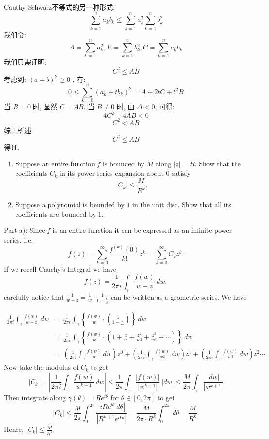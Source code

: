 \documentclass[12pt]{article}
\newenvironment{solution}[2][Solution]{\begin{trivlist}
\item[\hskip \labelsep {\bfseries #1}]}{\end{trivlist}}
\newenvironment{problem}[2][Problem]{\begin{trivlist}
\item[\hskip \labelsep {\bfseries #1}\hskip \labelsep {\bfseries #2.}]}{\end{trivlist}}
\begin{document}
\begin{solution}{2}
Cauthy-Schwarz不等式的另一种形式:
\[
\sum_{k=1}^{n} a_kb_k \leq \sum_{k=1}^n a{_k^2} \sum_{k=1}^{n} b{_k^2}
\]
我们令:
\[
A = \sum_{k=1}^{n} a{_k^2}, 
B = \sum_{k=1}^{n} b{_k^2},
C = \sum_{k=1}^{n} a_kb_k
\]
我们只需证明:
\[
C^2 \leq AB
\]
考虑到: $(a+b)^2 \geq 0$ , 有:
\[
0 \leq \sum_{k=0}^n (a_k+tb_k)^2 = A + 2tC + t^2B
\]
当 $B = 0$ 时, 显然 $C = AB$.
当 $B \neq 0$ 时, 由 $\Delta <0$, 可得:
\[
4C^2 - 4AB < 0
\]
\[
C^2 < AB
\]
综上所述:
\[
C^2 \leq AB
\]
得证.
\end{solution}


\vspace{2cm}



\begin{problem}{2}
\begin{enumerate}[label=\alph*)]
    \item Suppose an entire function $f$ is bounded by $M$ along $|z|=R$. Show that the coefficients $C_k$ in its power series expansion about $0$ satisfy
    \[
    |C_k|\leq\frac{M}{R^k}.
    \]
    \item Suppose a polynomial is bounded by $1$ in the unit disc. Show that all its coefficients are bounded by 1.
\end{enumerate}
\end{problem}

\begin{solution}{}
Part a): Since $f$ is an entire function it can be expressed as an infinite power series, i.e.
\[
f(z)=\sum_{k=0}^\infty\frac{f^{(k)}(0)}{k!}z^k=\sum_{k=0}^\infty C_kz^k.
\]
If we recall Cauchy's Integral we have
\[
f(z)=\frac{1}{2\pi i}\int_\gamma\frac{f(w)}{w-z}\ dw,
\]
carefully notice that $\frac{1}{w-z}=\frac{1}{w}\cdot\frac{1}{1-\frac{z}{w}}$ can be written as a geometric series. We have

\begin{align*}
\frac{1}{2\pi i}\int_\gamma\frac{f(w)}{w-z}\ dw &=\frac{1}{2\pi i}\int_\gamma\left\lbrace\frac{f(w)}{w}\cdot\left(\frac{1}{1-\frac{z}{w}}\right) \right\rbrace\ dw\\[8pt]
&=\frac{1}{2\pi i}\int_\gamma\left\lbrace\frac{f(w)}{w}\cdot\left(1+\frac{z}{w}+\frac{z^2}{w^2}+\frac{z^3}{w^3}+\cdots\right) \right\rbrace\ dw\\[8pt]
&=\left(\frac{1}{2\pi i}\int_\gamma \frac{f(w)}{w}\ dw\right)z^0+\left(\frac{1}{2\pi i}\int_\gamma \frac{f(w)}{w^2}\ dw\right)z^1+\left(\frac{1}{2\pi i}\int_\gamma \frac{f(w)}{w^3}\ dw\right)z^2\cdots
\end{align*}
Now take the modulus of $C_k$ to get
\[
|C_k|=\left\lvert\frac{1}{2\pi i}\int_\gamma \frac{f(w)}{w^{k+1}}\ dw \right\rvert\leq\frac{1}{2\pi}\int_\gamma\frac{|f(w)|}{|w^{k+1}|}\ |dw|\leq \frac{M}{2\pi}\int_\gamma\frac{|dw|}{|w^{k+1}|}
\]
Then integrate along $\gamma(\theta)=Re^{i\theta}$ for $\theta\in [0,2\pi]$ to get
\[
|C_k|\leq \frac{M}{2\pi}\int_0^{2\pi}\frac{|iRe^{i\theta}\ d\theta|}{|R^{k+1}e^{ik\theta}|}=\frac{M}{2\pi\cdot R^k}\int_0^{2\pi}\ d\theta=\frac{M}{R^k}.
\]
Hence, $|C_k|\leq \frac{M}{R^k}$.
\end{solution}
\pagebreak
\end{document}
